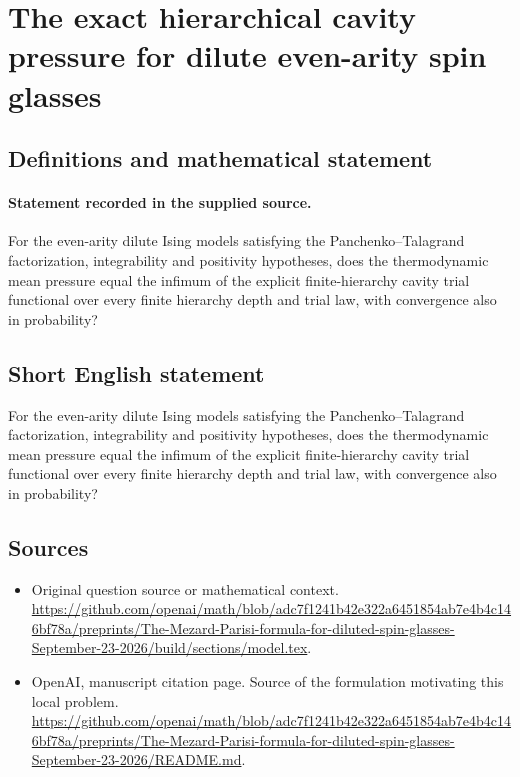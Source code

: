 \documentclass[11pt]{article}
\begin{document}
\section*{The exact hierarchical cavity pressure for dilute even-arity spin glasses}\label{30007348}
\subsection{Definitions and mathematical statement}
\paragraph{Statement recorded in the supplied source.}
For the even-arity dilute Ising models satisfying the Panchenko–Talagrand factorization, integrability and positivity hypotheses, does the thermodynamic mean pressure equal the infimum of the explicit finite-hierarchy cavity trial functional over every finite hierarchy depth and trial law, with convergence also in probability?
\subsection{Short English statement}
For the even-arity dilute Ising models satisfying the Panchenko–Talagrand factorization, integrability and positivity hypotheses, does the thermodynamic mean pressure equal the infimum of the explicit finite-hierarchy cavity trial functional over every finite hierarchy depth and trial law, with convergence also in probability?
\subsection{Sources}
\begin{itemize}
\item[S1] Original question source or mathematical context.
\url{https://github.com/openai/math/blob/adc7f1241b42e322a6451854ab7e4b4c146bf78a/preprints/The-Mezard-Parisi-formula-for-diluted-spin-glasses-September-23-2026/build/sections/model.tex}.
\item[S2] OpenAI, manuscript citation page. Source of the formulation motivating this local problem.
\url{https://github.com/openai/math/blob/adc7f1241b42e322a6451854ab7e4b4c146bf78a/preprints/The-Mezard-Parisi-formula-for-diluted-spin-glasses-September-23-2026/README.md}.
\end{itemize}
\end{document}
